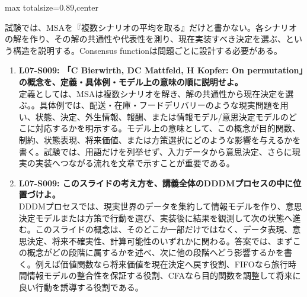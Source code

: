 \begin{minipage}[t]{0.58\textwidth}
\begin{adjustbox}{max totalsize={\textwidth}{0.89\textheight},center}
\begin{minipage}{\textwidth}
試験では、MSAを『複数シナリオの平均を取る』だけと書かない。各シナリオの解を作り、その解の共通性や代表性を測り、現在実装すべき決定を選ぶ、という構造を説明する。Consensus functionは問題ごとに設計する必要がある。\par{}\begin{enumerate}\item \textbf{L07-S009: 「C Bierwirth, DC Mattfeld, H Kopfer: On permutation」の概念を、定義・具体例・モデル上の意味の順に説明せよ。}\\定義としては、MSAは複数シナリオを解き、解の共通性から現在決定を選ぶ。。具体例では、配送・在庫・フードデリバリーのような現実問題を用い、状態、決定、外生情報、報酬、または情報モデル/意思決定モデルのどこに対応するかを明示する。モデル上の意味として、この概念が目的関数、制約、状態表現、将来価値、または方策選択にどのような影響を与えるかを書く。試験では、用語だけを列挙せず、入力データから意思決定、さらに現実の実装へつながる流れを文章で示すことが重要である。\item \textbf{L07-S009: このスライドの考え方を、講義全体のDDDMプロセスの中に位置づけよ。}\\DDDMプロセスでは、現実世界のデータを集約して情報モデルを作り、意思決定モデルまたは方策で行動を選び、実装後に結果を観測して次の状態へ進む。このスライドの概念は、そのどこか一部だけではなく、データ表現、意思決定、将来不確実性、計算可能性のいずれかに関わる。答案では、まずこの概念がどの段階に属するかを述べ、次に他の段階へどう影響するかを書く。例えば価値関数なら将来価値を現在決定へ戻す役割、FIFOなら旅行時間情報モデルの整合性を保証する役割、CFAなら目的関数を調整して将来に良い行動を誘導する役割である。\end{enumerate}
\end{minipage}
\end{adjustbox}
\end{minipage}


